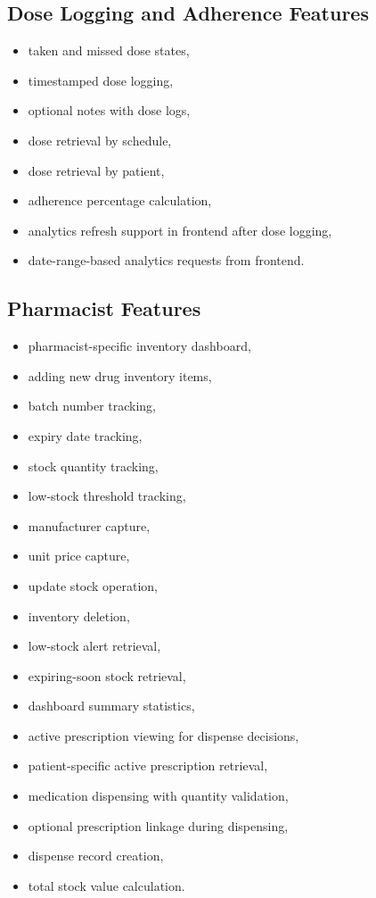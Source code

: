 \documentclass[12pt,a4paper]{article}
\begin{document}
\subsection{Dose Logging and Adherence Features}
\begin{itemize}[leftmargin=*]
  \item taken and missed dose states,
  \item timestamped dose logging,
  \item optional notes with dose logs,
  \item dose retrieval by schedule,
  \item dose retrieval by patient,
  \item adherence percentage calculation,
  \item analytics refresh support in frontend after dose logging,
  \item date-range-based analytics requests from frontend.
\end{itemize}

\subsection{Pharmacist Features}
\begin{itemize}[leftmargin=*]
  \item pharmacist-specific inventory dashboard,
  \item adding new drug inventory items,
  \item batch number tracking,
  \item expiry date tracking,
  \item stock quantity tracking,
  \item low-stock threshold tracking,
  \item manufacturer capture,
  \item unit price capture,
  \item update stock operation,
  \item inventory deletion,
  \item low-stock alert retrieval,
  \item expiring-soon stock retrieval,
  \item dashboard summary statistics,
  \item active prescription viewing for dispense decisions,
  \item patient-specific active prescription retrieval,
  \item medication dispensing with quantity validation,
  \item optional prescription linkage during dispensing,
  \item dispense record creation,
  \item total stock value calculation.
\end{itemize}
\end{document}

